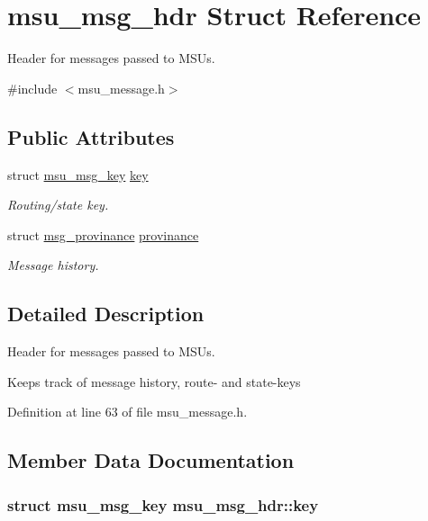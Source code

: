 \hypertarget{structmsu__msg__hdr}{\section{msu\-\_\-msg\-\_\-hdr Struct Reference}
\label{structmsu__msg__hdr}
}


Header for messages passed to M\-S\-Us.  




{\ttfamily \#include $<$msu\-\_\-message.\-h$>$}

\subsection*{Public Attributes}
\begin{DoxyCompactItemize}
\item 
struct \hyperlink{structmsu__msg__key}{msu\-\_\-msg\-\_\-key} \hyperlink{structmsu__msg__hdr_a4fdc31ee60340dd9b2550df651fb185a}{key}
\begin{DoxyCompactList}\small\item\em Routing/state key. \end{DoxyCompactList}\item 
struct \hyperlink{structmsg__provinance}{msg\-\_\-provinance} \hyperlink{structmsu__msg__hdr_ab64c7b4c508dd04d23bbd940cd6dabea}{provinance}
\begin{DoxyCompactList}\small\item\em Message history. \end{DoxyCompactList}\end{DoxyCompactItemize}


\subsection{Detailed Description}
Header for messages passed to M\-S\-Us. 

Keeps track of message history, route-\/ and state-\/keys 

Definition at line 63 of file msu\-\_\-message.\-h.



\subsection{Member Data Documentation}
\hypertarget{structmsu__msg__hdr_a4fdc31ee60340dd9b2550df651fb185a}{
\subsubsection[{key}]{\setlength{\rightskip}{0pt plus 5cm}struct {\bf msu\-\_\-msg\-\_\-key} msu\-\_\-msg\-\_\-hdr\-::key}}\label{structmsu__msg__hdr_a4fdc31ee60340dd9b2550df651fb185a}


